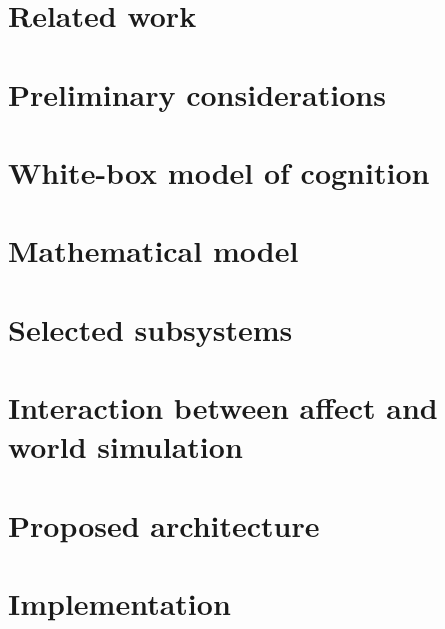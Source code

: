 \documentclass[draft,final]{vutinfth}
\begin{document}
	
	
	\chapter{Related work}\label{sec:relatedWork}
	
	
	
	\chapter{Preliminary considerations}\label{sec:preliminaries}
	
	
	
	\chapter{White-box model of cognition}\label{sec:schemaOfCognition}
	
	
	
	\chapter{Mathematical model}\label{sec:mathematicalModel}
	
	
	
	\chapter{Selected subsystems}\label{sec:selectedSubsystems}
	
	
	
	\chapter{Interaction between affect and world simulation}
	
	
	
	\chapter{Proposed architecture}\label{sec:proposedArchitecture}
	
	\chapter{Implementation}\label{sec:implementation}
	
	
	
\end{document}
